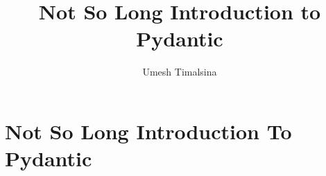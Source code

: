 \documentclass[12pt]{article}
\title{Not So Long Introduction to Pydantic}
\author{Umesh Timalsina}
\begin{document}
    \maketitle
    \section{Not So Long Introduction To Pydantic}
\end{document}
